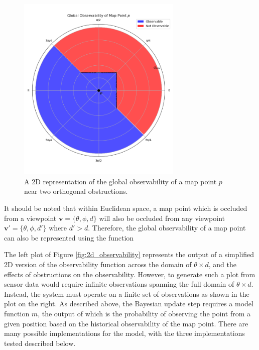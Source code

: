 \begin{figure}[!ht]
    \centering
    \includegraphics[width=0.7\textwidth]{resources/global_observability_p.png}
    \caption[2D Global Observability]{A 2D representation of the global observability of a map point $p$ near two orthogonal obstructions.}
    \label{fig:global_observability_p}
\end{figure}

It should be noted that within Euclidean space, a map point which is occluded from a viewpoint $\boldsymbol{v} = \{\theta, \phi, d\}$ will also be occluded from any viewpoint $\boldsymbol{v}' = \{\theta, \phi, d'\}$ where $d'>d$. Therefore, the global observability of a map point can also be represented using the function
\[

\]

The left plot of Figure \ref{fig:2d_observability} represents the output of a simplified 2D version of the observability function across the domain of $\theta\times d$, and the effects of obstructions on the observability. However, to generate such a plot from sensor data would require infinite observations spanning the full domain of $\theta\times d$. Instead, the system must operate on a finite set of observations as shown in the plot on the right. As described above, the Bayesian update step requires a model function $m$, the output of which is the probability of observing the point from a given position based on the historical observability of the map point. There are many possible implementations for the model, with the three implementations tested described below.

